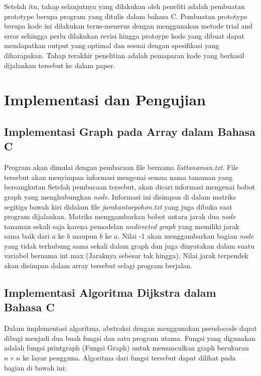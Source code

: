 \documentclass[conference]{IEEEtran}
\begin{document}
Setelah itu, tahap selanjutnya yang dilakukan oleh peneliti adalah pembuatan prototype berupa program yang ditulis dalam bahasa C. Pembuatan prototype berupa kode ini dilakukan terus-menerus dengan menggunakan metode trial and error sehingga perlu dilakukan revisi hingga protoype kode yang dibuat dapat mendapatkan output yang optimal dan sesuai dengan spesifikasi yang diharapakan. Tahap terakhir penelitian adalah pemaparan kode yang berhasil dijalankan tersebut ke dalam paper.

\begin{figure}[htbp]
    \centering
    \scalebox{1.5}{}
\end{figure}

\section{Implementasi dan Pengujian}
    \subsection{Implementasi Graph pada Array dalam Bahasa C}
    Program akan dimulai dengan pembacaan file bernama \textit{listtanaman.txt}. File tersebut akan menyimpan informasi mengenai semua nama tanaman yang bersangkutan Setelah pembacaan tersebut, akan dicari informasi mengenai bobot graph yang menghubungkan \textit{node}. Informasi ini disimpan di dalam matriks segitiga bawah kiri didalam file \textit{jarakantarpohon.txt} yang juga dibuka saat program dijalankan. Matriks menggambarkan bobot antara jarak dua \textit{node} tanaman sekali saja karena pemodelan \textit{undirected graph} yang memiliki jarak sama baik dari $a$ ke $b$ maupun $b$ ke $a$. Nilai -1 akan menggambarkan bagian \textit{node} yang tidak terhubung sama sekali dalam graph dan juga dinyatakan dalam suatu variabel bernama int max (Jaraknya sebesar tak hingga). Nilai jarak terpendek akan disimpan dalam array tersebut selagi program berjalan.

    \subsection{Implementasi Algoritma Dijkstra dalam Bahasa C}
    Dalam implementasi algoritma, abstraksi dengan menggunakan pseudocode dapat dibagi menjadi dua buah fungsi dan satu program utama. Fungsi yang digunakan adalah fungsi printgraph (Fungsi Graph) untuk memunculkan graph berukuran $n \times n$ ke layar pengguna. Algoritma dari fungsi tersebut dapat dilihat pada bagian di bawah ini:
\end{document}
